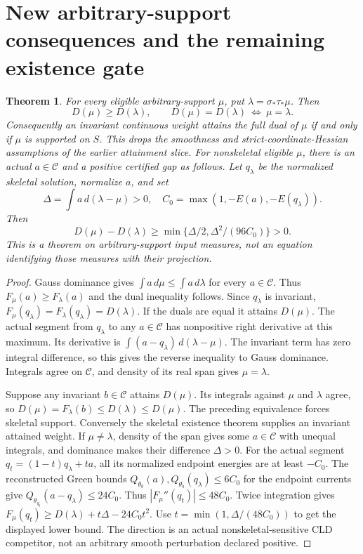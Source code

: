 \documentclass[11pt]{article}
\newtheorem{theorem}{Theorem}
\newcommand{\C}{\mathcal C}
\begin{document}
\section{New arbitrary-support consequences and the remaining existence gate}
\begin{theorem}\label{newrad:projection}
For every eligible arbitrary-support $\mu$, put
$\lambda=\sigma_*\tau_*\mu$. Then
\[
 D(\mu)\ge D(\lambda),\qquad
 D(\mu)=D(\lambda)\ \Longleftrightarrow\ \mu=\lambda.
\]
Consequently an invariant continuous weight attains the full dual of
$\mu$ if and only if $\mu$ is supported on $S$. This drops the
smoothness and strict-coordinate-Hessian assumptions of the earlier
attainment slice. For nonskeletal eligible $\mu$, there is an actual
$a\in\C$ and a positive certified gap as follows. Let $q_\lambda$
be the normalized skeletal solution, normalize $a$, and set
\[
 \Delta=\int a\,d(\lambda-\mu)>0,
 \quad C_0=\max(1,-E(a),-E(q_\lambda)).
\]
Then
\[
 D(\mu)-D(\lambda)\ge
 \min\{\Delta/2,\Delta^2/(96C_0)\}>0.
\]
This is a theorem on arbitrary-support input measures, not an equation
identifying those measures with their projection.
\end{theorem}
\begin{proof}
Gauss dominance gives $\int a\,d\mu\le\int a\,d\lambda$ for every
$a\in\C$. Thus $F_\mu(a)\ge F_\lambda(a)$ and the dual inequality
follows. Since $q_\lambda$ is invariant,
$F_\mu(q_\lambda)=F_\lambda(q_\lambda)=D(\lambda)$.
If the duals are equal it attains $D(\mu)$. The actual segment from
$q_\lambda$ to any $a\in\C$ has nonpositive right derivative at
this maximum. Its derivative is
$\int(a-q_\lambda)\,d(\lambda-\mu)$.
The invariant term has zero integral difference, so this gives the
reverse inequality to Gauss dominance. Integrals agree on $\C$,
and density of its real span gives $\mu=\lambda$.

Suppose any invariant $b\in\C$ attains $D(\mu)$. Its integrals
against $\mu$ and $\lambda$ agree, so
$D(\mu)=F_\lambda(b)\le D(\lambda)\le D(\mu)$.
The preceding equivalence forces skeletal support. Conversely the
skeletal existence theorem supplies an invariant attained weight.
If $\mu\ne\lambda$, density of the span gives some $a\in\C$ with
unequal integrals, and dominance makes their difference $\Delta>0$.
For the actual segment $q_t=(1-t)q_\lambda+ta$, all its normalized
endpoint energies are at least $-C_0$. The reconstructed Green bounds
$Q_{\theta_b}(a),Q_{\theta_b}(q_\lambda)\le6C_0$ for the endpoint
currents give $Q_{\theta_{q_t}}(a-q_\lambda)\le24C_0$.
Thus $|F_\mu''(q_t)|\le48C_0$. Twice integration gives
$F_\mu(q_t)\ge D(\lambda)+t\Delta-24C_0t^2$.
Use $t=\min(1,\Delta/(48C_0))$ to get the displayed lower bound.
The direction is an actual nonskeletal-sensitive CLD competitor, not
an arbitrary smooth perturbation declared positive.
\end{proof}
\end{document}
